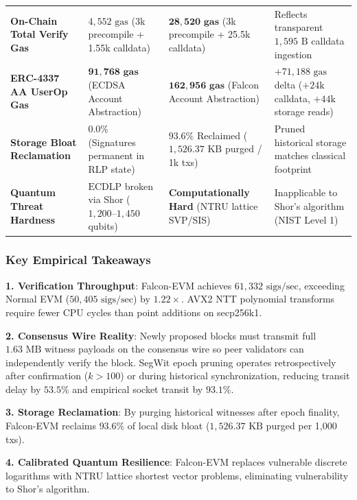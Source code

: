 \documentclass[a4paper,fleqn]{cas-dc}
\begin{document}
\begin{table}[htbp]
{\begin{tabular}{p{3.8cm} p{4.0cm} p{4.4cm} p{4.6cm}}
\textbf{On-Chain Total Verify Gas} & $4,552\text{ gas}$ (3k precompile + 1.55k calldata) & $\mathbf{28,520\text{ gas}}$ (3k precompile + 25.5k calldata) & Reflects transparent $1,595\text{ B}$ calldata ingestion \\
\textbf{ERC-4337 AA UserOp Gas} & $\mathbf{91,768\text{ gas}}$ (ECDSA Account Abstraction) & $\mathbf{162,956\text{ gas}}$ (Falcon Account Abstraction) & $+71,188\text{ gas}$ delta ($+24\text{k}$ calldata, $+44\text{k}$ storage reads) \\
\textbf{Storage Bloat Reclamation} & $0.0\%$ (Signatures permanent in RLP state) & $\mathbf{93.6\%}$ Reclaimed ($1,526.37\text{ KB}$ purged / 1k txs) & Pruned historical storage matches classical footprint \\
\textbf{Quantum Threat Hardness} & $\text{ECDLP}$ broken via Shor ($1,200\text{--}1,450$ qubits) & \textbf{Computationally Hard} (NTRU lattice SVP/SIS) & Inapplicable to Shor's algorithm (NIST Level 1) \\
\bottomrule
\end{tabular}%
}
\endgroup
\end{table}

\subsubsection{Key Empirical Takeaways}
\textbf{1. Verification Throughput}: Falcon-EVM achieves \textbf{$61,332\text{ sigs/sec}$}, exceeding Normal EVM ($50,405\text{ sigs/sec}$) by \textbf{$1.22\times$}. AVX2 NTT polynomial transforms require fewer CPU cycles than point additions on secp256k1.

\textbf{2. Consensus Wire Reality}: Newly proposed blocks must transmit full $1.63\text{ MB}$ witness payloads on the consensus wire so peer validators can independently verify the block. SegWit epoch pruning operates retrospectively after confirmation ($k > 100$) or during historical synchronization, reducing transit delay by $53.5\%$ and empirical socket transit by $93.1\%$.

\textbf{3. Storage Reclamation}: By purging historical witnesses after epoch finality, Falcon-EVM reclaims \textbf{$93.6\%$} of local disk bloat ($1,526.37\text{ KB}$ purged per 1,000 txs).

\textbf{4. Calibrated Quantum Resilience}: Falcon-EVM replaces vulnerable discrete logarithms with NTRU lattice shortest vector problems, eliminating vulnerability to Shor's algorithm.
\end{document}
